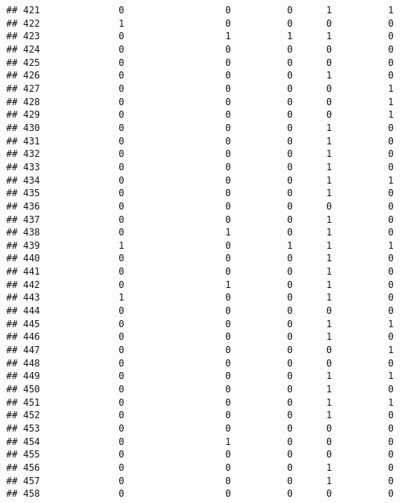 \documentclass[
]{article}
\begin{document}
\begin{verbatim}
## 421              0                  0          0      1          1
## 422              1                  0          0      0          0
## 423              0                  1          1      1          0
## 424              0                  0          0      0          0
## 425              0                  0          0      0          0
## 426              0                  0          0      1          0
## 427              0                  0          0      0          1
## 428              0                  0          0      0          1
## 429              0                  0          0      0          1
## 430              0                  0          0      1          0
## 431              0                  0          0      1          0
## 432              0                  0          0      1          0
## 433              0                  0          0      1          0
## 434              0                  0          0      1          1
## 435              0                  0          0      1          0
## 436              0                  0          0      0          0
## 437              0                  0          0      1          0
## 438              0                  1          0      1          0
## 439              1                  0          1      1          1
## 440              0                  0          0      1          0
## 441              0                  0          0      1          0
## 442              0                  1          0      1          0
## 443              1                  0          0      1          0
## 444              0                  0          0      0          0
## 445              0                  0          0      1          1
## 446              0                  0          0      1          0
## 447              0                  0          0      0          1
## 448              0                  0          0      0          0
## 449              0                  0          0      1          1
## 450              0                  0          0      1          0
## 451              0                  0          0      1          1
## 452              0                  0          0      1          0
## 453              0                  0          0      0          0
## 454              0                  1          0      0          0
## 455              0                  0          0      0          0
## 456              0                  0          0      1          0
## 457              0                  0          0      1          0
## 458              0                  0          0      0          0

\end{verbatim}
\end{document}
